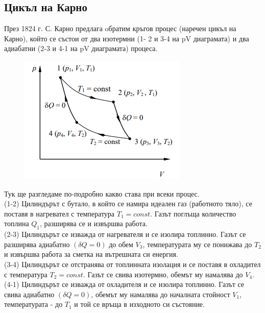 \documentclass[fleqn, 12pt]{article}
\theoremstyle{definition}
\begin{document}
\subsection{Цикъл на Карно}
През 1824 г. С. Карно предлага oбратим кръгов процес (наречен цикъл на Карно), който се състои от два изотермни (1-
2 и 3-4 на pV диаграмата) и два адиабатни (2-3 и 4-1 на pV диаграмата) процеса.\\
\begin{figure}[htp!]
  \includegraphics[width = \linewidth]{Pics/physics/lec4-8.png}
\end{figure}
Тук ще разгледаме по-подробно какво става при всеки процес.\\
(1-2) Цилиндърът с бутало, в който се намира идеален газ (работното тяло), се поставя в нагревател с температура $T_1 = const$. Газът поглъща количество топлина $Q_1$, разширява се и извършва работа. \\
(2-3) Цилиндърът се изважда от нагревателя и се изолира топлинно. Газът се
разширява адиабатно $(\delta Q = 0)$ до обем $V_3$, температурата му се понижава до $T_2$ и 
извършва работа за сметка на вътрешната си енергия.\\
(3-4) Цилиндърът се отстранява от топлинната изолация и се поставя в охладител
с температура $T_2 = const$. Газът се свива изотермно, обемът му намалява до $V_4$. \\
(4-1) Цилиндърът се изважда от охладителя и се изолира топлинно. Газът се
свива адиабатно $(\delta Q = 0)$, обемът му намалява до началната стойност $V_1$, температурата - до
$T_1$ и той се връща в изходното си състояние. \\
\end{document}
